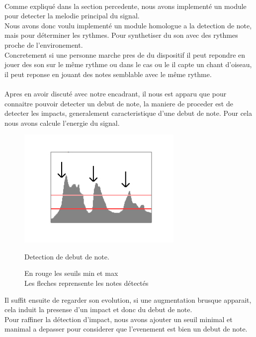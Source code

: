 \documentclass[a4paper, titlepage, oneside, 12pt]{article}%
\begin{document}
\paragraph{}
Comme expliqué dans la section percedente, nous avons implementé un module pour detecter la melodie principal du signal.\\

Nous avons donc voulu implementé un module homologue a la detection de note, mais pour déterminer les rythmes. Pour synthetiser du son avec des rythmes proche de l'environement.\\
Concretement si une personne marche pres de du dispositif il peut repondre en jouer des son sur le même rythme ou dans le cas ou le il capte un chant d'oiseau, il peut reponse en jouant des notes semblable avec le même rythme.\\

\paragraph{}
Apres en avoir discuté avec notre encadrant, il nous est apparu que pour connaitre pouvoir detecter un debut de note, la maniere de proceder est de detecter les impacts, generalement caracteristique d'une debut de note. Pour cela  nous avons calcule l'energie du signal. 
\begin{figure}[H]
	\centering
	\includegraphics[width=300px]{bonk.jpg}
	\caption{Detection de debut de note.}
	\caption{En rouge les seuils min et max\\Les fleches reprensente les notes détectés}
\end{figure}
Il suffit ensuite de regarder son evolution, si une augmentation brusque apparait, cela induit la presense d'un impact et donc du debut de note.\\
Pour raffiner la détection d'impact, nous avons ajouter un seuil minimal et manimal a depasser pour considerer que l'evenement est bien un debut de note.
 
\end{document}
